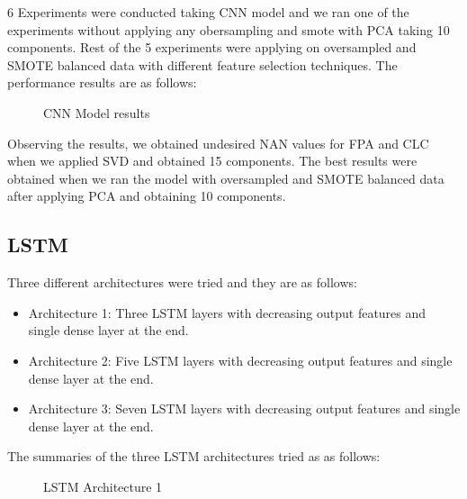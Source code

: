 6 Experiments were conducted taking CNN model and we ran one of the experiments without applying any obersampling and smote with PCA taking 10 components. Rest of the 5 experiments were applying on oversampled and SMOTE balanced data with different feature selection techniques. The performance results are as follows:
 
 \begin{figure}
%
  \caption{CNN Model results}
  \label{fig:key}
\end{figure}
 
Observing the results, we obtained undesired NAN values for FPA and CLC when we applied SVD and obtained 15 components. The best results were obtained when we ran the model with oversampled and SMOTE balanced data after applying PCA and obtaining 10 components. 

\subsection{LSTM}

Three different architectures were tried and they are as follows:
 \begin{itemize}
     \item Architecture 1: Three LSTM layers with decreasing output features and single dense layer at the end.
     \item Architecture 2: Five LSTM layers with decreasing output features and single dense layer at the end.
     \item Architecture 3: Seven LSTM layers with decreasing output features and single dense layer at the end.
 \end{itemize}
 
 The summaries of the three LSTM architectures tried as as follows:
 
 \begin{figure}
%
  \caption{LSTM Architecture 1}
  \label{fig:key}
\end{figure}

